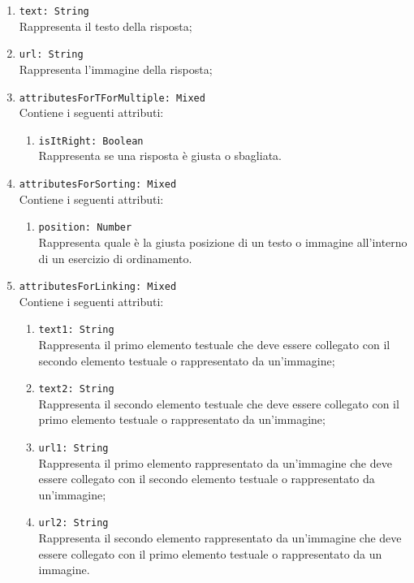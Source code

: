 \begin{itemize}
\begin{itemize}
\begin{itemize}
\begin{itemize}
\begin{enumerate}
						\item \texttt{text: String}\\ Rappresenta il testo della risposta;
        					\item \texttt{url: String}\\ Rappresenta l'immagine della risposta;
        					\item \texttt{attributesForTForMultiple: Mixed}\\ Contiene i seguenti attributi:
        					\begin{enumerate}
        						\item \texttt{isItRight: Boolean}\\ Rappresenta se una risposta è giusta o sbagliata.
						\end{enumerate}      
						\item \texttt{attributesForSorting: Mixed}\\ Contiene i seguenti attributi:
        					\begin{enumerate}
        						\item \texttt{position: Number}\\ Rappresenta quale è la giusta posizione di un testo o immagine all'interno di un esercizio di ordinamento.
						\end{enumerate}  
							\item \texttt{attributesForLinking: Mixed}\\ Contiene i seguenti attributi:
        					\begin{enumerate}
        						\item \texttt{text1: String}\\ Rappresenta il primo elemento testuale che deve essere collegato con il secondo elemento testuale o rappresentato da un'immagine;
        						\item \texttt{text2: String}\\ Rappresenta il secondo elemento testuale che deve essere collegato con il primo elemento testuale o rappresentato da un'immagine;
        						\item \texttt{url1: String}\\ Rappresenta il primo elemento rappresentato da un'immagine che deve essere collegato con il secondo elemento testuale o rappresentato da un'immagine;
        						\item \texttt{url2: String}\\ Rappresenta il secondo elemento rappresentato da un'immagine che deve essere collegato con il primo elemento testuale o rappresentato da un immagine.

\end{enumerate}
\end{enumerate}
\end{itemize}
\end{itemize}
\end{itemize}
\end{itemize}
